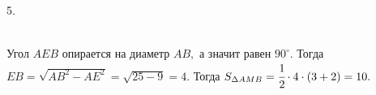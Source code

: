 5. \begin{figure}[ht!]
\end{figure}\\
Угол $AEB$ опирается на диаметр $AB,$ а значит равен $90^\circ.$ Тогда $EB=\sqrt{AB^2-AE^2}=\sqrt{25-9}=4.$ Тогда $S_{\Delta AMB}=\cfrac{1}{2}\cdot4\cdot (3+2)=10.$\\
